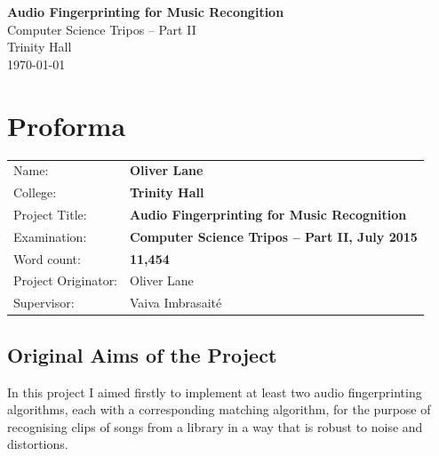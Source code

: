 \documentclass[12pt,a4paper,twoside,openright]{report}
\begin{document}





\pagestyle{empty}


\vspace*{60mm}
\begin{center}
\Huge
\textbf{Audio Fingerprinting for Music Recongition} \\[5mm]
Computer Science Tripos -- Part II \\[5mm]
Trinity Hall \\[5mm]
\today  %
\end{center}


\pagestyle{plain}

\chapter*{Proforma}

{\large
\begin{tabular}{ll}
Name:               & \bf Oliver Lane                       \\
College:            & \bf Trinity Hall                     \\
Project Title:      & \bf Audio Fingerprinting for Music Recognition \\
Examination:        & \bf Computer Science Tripos -- Part II, July 2015  \\
Word count:         & \bf 11,454  \\
Project Originator: & Oliver Lane                    \\
Supervisor:         & Vaiva Imbrasait\'{e}                    \\ 
\end{tabular}
}


\section*{Original Aims of the Project}

In this project I aimed firstly to implement at least two audio fingerprinting algorithms, each with a corresponding matching algorithm, for the purpose of recognising clips of songs from a library in a way that is robust to noise and distortions.
\end{document}
